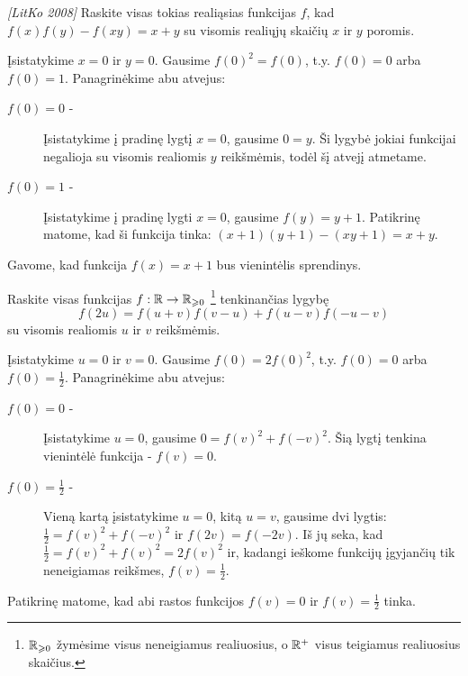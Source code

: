 \begin{pavnr} \emph{[LitKo 2008]} Raskite visas tokias realiąsias funkcijas
  $f$, kad $f(x)f(y) - f(xy) = x+y$ su visomis realiųjų skaičių $x$ ir $y$
  poromis.
\end{pavnr}

\begin{sprendimas} Įsistatykime $x=0$ ir $y=0$. Gausime $f(0)^2=f(0)$, t.y.
  $f(0)=0$ arba $f(0)=1$. Panagrinėkime abu atvejus:
  \begin{description}
    \item[$f(0)=0$ -] Įsistatykime į pradinę lygtį $x=0$, gausime $0=y$. Ši
      lygybė jokiai funkcijai negalioja su visomis realiomis $y$
      reikšmėmis, todėl šį atvejį atmetame.
    \item[$f(0)=1$ -] Įsistatykime į pradinę lygti $x=0$, gausime $f(y) =
      y+1$. Patikrinę matome, kad ši funkcija tinka: $(x+1)(y+1) - (xy + 1)
      = x+y$.
  \end{description}
  Gavome, kad funkcija $f(x)=x+1$ bus vienintėlis sprendinys.
\end{sprendimas}

\begin{pavnr}
  Raskite visas funkcijas $f: \mathbb R\to\mathbb R_{\geqslant 0}$ \footnote{$\mathbb R_{\geqslant0 }$
  žymėsime visus neneigiamus realiuosius, o $\mathbb R^+$ visus teigiamus
  realiuosius skaičius.} tenkinančias lygybę $$f(2u)=f(u+v)f(v-u)+f(u-v)f(-u-v)$$ su
  visomis realiomis $u$ ir $v$ reikšmėmis.
\end{pavnr}

\begin{sprendimas} Įsistatykime $u=0$ ir $v=0$. Gausime $f(0)=2f(0)^2$,
  t.y. $f(0)=0$ arba $f(0) = \frac{1}{2}$. Panagrinėkime abu atvejus:
  \begin{description}
    \item[$f(0)=0$ -] Įsistatykime $u = 0$, gausime $0 = f(v)^2 +
      f(-v)^2$. Šią lygtį tenkina vienintėlė funkcija - $f(v)=0$.
    \item[$f(0)=\frac{1}{2}$ -] Vieną kartą įsistatykime $u = 0$, kitą $u =
      v$, gausime dvi lygtis: $\frac{1}{2} = f(v)^2 + f(-v)^2$ ir $f(2v) =
      f(-2v)$. Iš jų seka, kad $\frac{1}{2} = f(v)^2 + f(v)^2 = 2f(v)^2$
      ir, kadangi ieškome funkcijų įgyjančių tik neneigiamas reikšmes,
      $f(v)= \frac{1}{2}$.
  \end{description}
Patikrinę matome, kad abi rastos funkcijos $f(v)=0$ ir $f(v)=\frac{1}{2}$
tinka.
\end{sprendimas}

